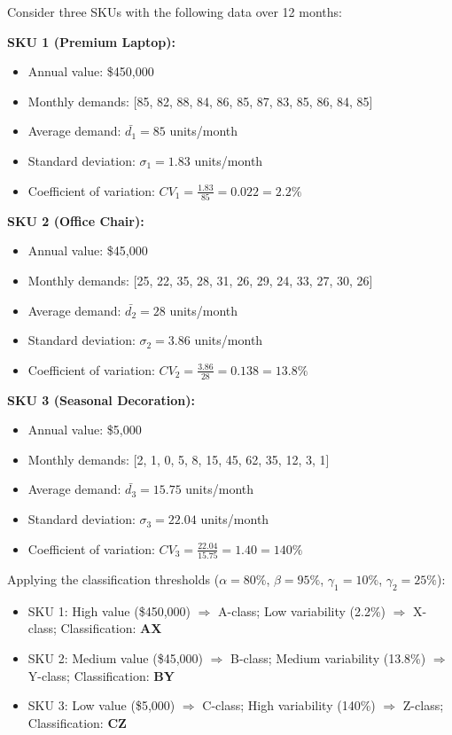 \documentclass{article}
\begin{document}
Consider three SKUs with the following data over 12 months:

\textbf{SKU 1 (Premium Laptop):}
\begin{itemize}
    \item Annual value: \$450,000
    \item Monthly demands: [85, 82, 88, 84, 86, 85, 87, 83, 85, 86, 84, 85]
    \item Average demand: $\bar{d_1} = 85$ units/month
    \item Standard deviation: $\sigma_1 = 1.83$ units/month
    \item Coefficient of variation: $CV_1 = \frac{1.83}{85} = 0.022 = 2.2\%$
\end{itemize}

\textbf{SKU 2 (Office Chair):}
\begin{itemize}
    \item Annual value: \$45,000
    \item Monthly demands: [25, 22, 35, 28, 31, 26, 29, 24, 33, 27, 30, 26]
    \item Average demand: $\bar{d_2} = 28$ units/month
    \item Standard deviation: $\sigma_2 = 3.86$ units/month
    \item Coefficient of variation: $CV_2 = \frac{3.86}{28} = 0.138 = 13.8\%$
\end{itemize}

\textbf{SKU 3 (Seasonal Decoration):}
\begin{itemize}
    \item Annual value: \$5,000
    \item Monthly demands: [2, 1, 0, 5, 8, 15, 45, 62, 35, 12, 3, 1]
    \item Average demand: $\bar{d_3} = 15.75$ units/month
    \item Standard deviation: $\sigma_3 = 22.04$ units/month
    \item Coefficient of variation: $CV_3 = \frac{22.04}{15.75} = 1.40 = 140\%$
\end{itemize}

Applying the classification thresholds ($\alpha = 80\%$, $\beta = 95\%$, $\gamma_1 = 10\%$, $\gamma_2 = 25\%$):

\begin{itemize}
    \item SKU 1: High value (\$450,000) $\Rightarrow$ A-class; Low variability (2.2\%) $\Rightarrow$ X-class; Classification: \textbf{AX}
    \item SKU 2: Medium value (\$45,000) $\Rightarrow$ B-class; Medium variability (13.8\%) $\Rightarrow$ Y-class; Classification: \textbf{BY}
    \item SKU 3: Low value (\$5,000) $\Rightarrow$ C-class; High variability (140\%) $\Rightarrow$ Z-class; Classification: \textbf{CZ}
\end{itemize}
\end{document}
